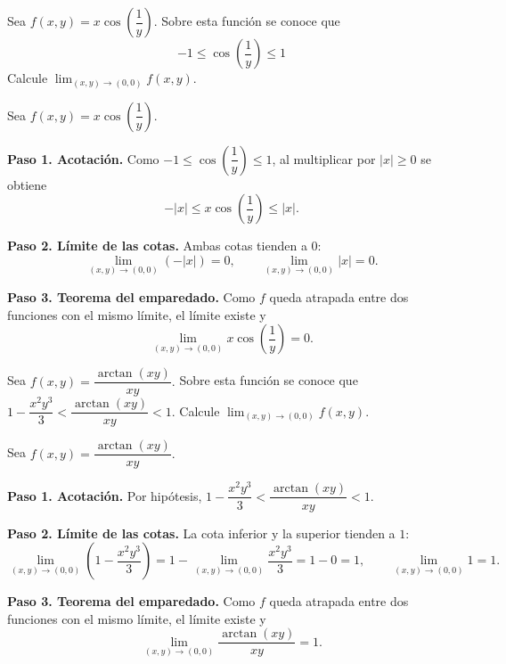 \begin{prob}
Sea $f(x,y)=x\cos\left(\dfrac{1}{y}\right).$ Sobre esta función se conoce que $$-1\leq \cos\left(\dfrac{1}{y}\right)\leq 1$$ Calcule $\displaystyle\lim_{(x,y)\to (0,0)}f(x,y).$
\begin{myproof}
Sea $f(x,y)=x\cos\left(\dfrac{1}{y}\right).$

\textbf{Paso 1. Acotación.} Como $-1\leq\cos\left(\dfrac{1}{y}\right)\leq 1$, al multiplicar por $|x|\geq 0$ se obtiene
\[
-|x|\leq x\cos\left(\dfrac{1}{y}\right)\leq |x|.
\]

\textbf{Paso 2. Límite de las cotas.} Ambas cotas tienden a $0$:
\[
\displaystyle\lim_{(x,y)\to (0,0)} (-|x|) = 0,\qquad \displaystyle\lim_{(x,y)\to (0,0)} |x| = 0.
\]

\textbf{Paso 3. Teorema del emparedado.} Como $f$ queda atrapada entre dos funciones con el mismo límite, el límite existe y
\[
\displaystyle\lim_{(x,y)\to (0,0)} x\cos\left(\dfrac{1}{y}\right) = \boxed{0}.
\]
\end{myproof}
\end{prob}

\begin{prob}
Sea $f(x,y)=\dfrac{\arctan(xy)}{xy}.$ Sobre esta función se conoce que $1-\dfrac{x^2y^3}{3}<\dfrac{\arctan (xy)}{xy}<1.$ Calcule $\displaystyle\lim_{(x,y)\to (0,0)}f(x,y).$
\begin{myproof}
Sea $f(x,y)=\dfrac{\arctan(xy)}{xy}.$

\textbf{Paso 1. Acotación.} Por hipótesis, $1-\dfrac{x^2y^3}{3}<\dfrac{\arctan (xy)}{xy}<1.$

\textbf{Paso 2. Límite de las cotas.} La cota inferior y la superior tienden a $1$:
\[
\displaystyle\lim_{(x,y)\to (0,0)} \left(1-\dfrac{x^2y^3}{3}\right) = 1-\displaystyle\lim_{(x,y)\to (0,0)} \dfrac{x^2y^3}{3}=1-0=1,\qquad \displaystyle\lim_{(x,y)\to (0,0)} 1=1.
\]

\textbf{Paso 3. Teorema del emparedado.} Como $f$ queda atrapada entre dos funciones con el mismo límite, el límite existe y
\[
\displaystyle\lim_{(x,y)\to (0,0)} \dfrac{\arctan(xy)}{xy} = \boxed{1}.
\]
\end{myproof}
\end{prob}

